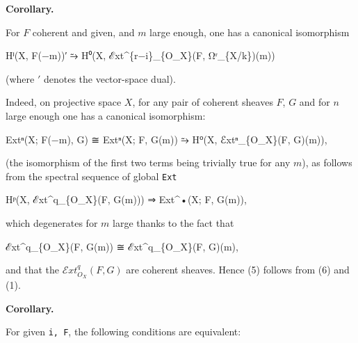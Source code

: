 \documentclass[
  11pt,
  a4paper,
]{book}
\newenvironment{Shaded}{}{}
\newcommand{\NormalTok}[1]{#1}
\begin{document}
\textbf{Corollary.}

For \(F\) coherent and given, and \(m\) large enough, one has a
canonical isomorphism

\begin{Shaded}
\begin{Highlighting}[]
\NormalTok{Hⁱ(X, F(−m))′ ⥲ H⁰(X, ℰxt\^{}\{r−i\}\_\{O\_X\}(F, Ωʳ\_\{X/k\})(m))}
\end{Highlighting}
\end{Shaded}

(where \('\) denotes the vector-space dual).

Indeed, on projective space \(X\), for any pair of coherent sheaves
\(F\), \(G\) and for \(n\) large enough one has a canonical isomorphism:

\begin{Shaded}
\begin{Highlighting}[]
\NormalTok{Extⁿ(X; F(−m), G) ≅ Extⁿ(X; F, G(m)) ⥲ H⁰(X, ℰxtⁿ\_\{O\_X\}(F, G)(m)),}
\end{Highlighting}
\end{Shaded}

(the isomorphism of the first two terms being trivially true for any
\(m\)), as follows from the spectral sequence of global \texttt{Ext}

\begin{Shaded}
\begin{Highlighting}[]
\NormalTok{Hᵖ(X, ℰxt\^{}q\_\{O\_X\}(F, G(m))) ⇒ Ext\^{}•(X; F, G(m)),}
\end{Highlighting}
\end{Shaded}

which degenerates for \(m\) large thanks to the fact that

\begin{Shaded}
\begin{Highlighting}[]
\NormalTok{ℰxt\^{}q\_\{O\_X\}(F, G(m)) ≅ ℰxt\^{}q\_\{O\_X\}(F, G)(m),}
\end{Highlighting}
\end{Shaded}

and that the \(\mathcal{E}xt^{q}_{O_{X}}(F, G)\) are coherent sheaves.
Hence (5) follows from (6) and (1).

\textbf{Corollary.}

For given \texttt{i,\ F}, the following conditions are equivalent:
\end{document}
